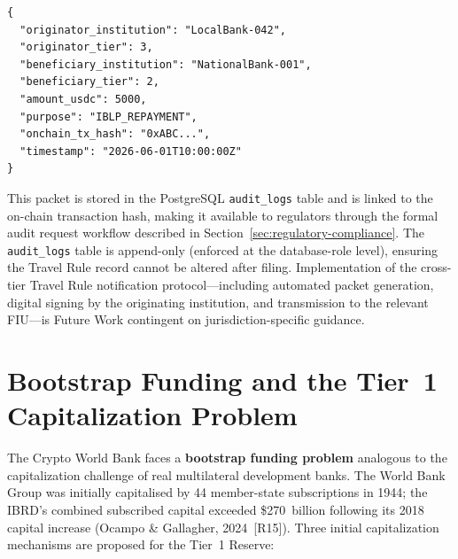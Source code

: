 \documentclass[12pt,a4paper]{report}
\begin{document}
\begin{verbatim}
{
  "originator_institution": "LocalBank-042",
  "originator_tier": 3,
  "beneficiary_institution": "NationalBank-001",
  "beneficiary_tier": 2,
  "amount_usdc": 5000,
  "purpose": "IBLP_REPAYMENT",
  "onchain_tx_hash": "0xABC...",
  "timestamp": "2026-06-01T10:00:00Z"
}
\end{verbatim}

\noindent This packet is stored in the PostgreSQL \texttt{audit\_logs} table and is linked to the on-chain transaction hash, making it available to regulators through the formal audit request workflow described in Section~\ref{sec:regulatory-compliance}. The \texttt{audit\_logs} table is append-only (enforced at the database-role level), ensuring the Travel Rule record cannot be altered after filing. Implementation of the cross-tier Travel Rule notification protocol---including automated packet generation, digital signing by the originating institution, and transmission to the relevant FIU---is Future Work contingent on jurisdiction-specific guidance.

\section{Bootstrap Funding and the Tier~1 Capitalization Problem}

The Crypto World Bank faces a \textbf{bootstrap funding problem} analogous to the capitalization challenge of real multilateral development banks. The World Bank Group was initially capitalised by 44 member-state subscriptions in 1944; the IBRD's combined subscribed capital exceeded \$270~billion following its 2018 capital increase (Ocampo \& Gallagher, 2024~[R15]). Three initial capitalization mechanisms are proposed for the Tier~1 Reserve:
\end{document}
